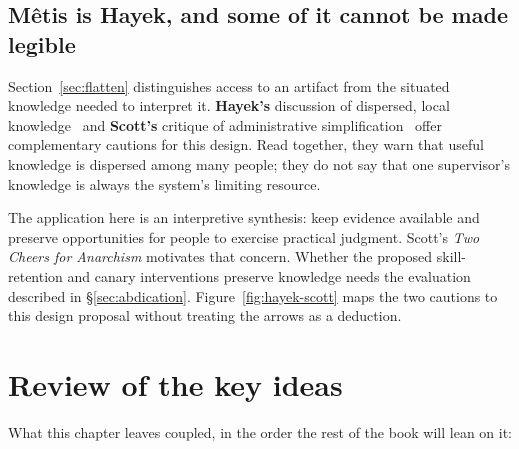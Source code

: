 \documentclass[11pt,a4paper]{article}
\theoremstyle{definition}
\theoremstyle{plain}
\begin{document}
\subsection{M\^etis is Hayek, and some of it cannot be made legible}\label{sec:hayek}

Section~\ref{sec:flatten} distinguishes access to an artifact from the situated
knowledge needed to interpret it. \textbf{Hayek's} discussion of dispersed,
local knowledge~ and \textbf{Scott's} critique of administrative
simplification~ offer complementary cautions for this design.
Read together, they warn that useful knowledge is dispersed among many people;
they do not say that one supervisor's knowledge is always the system's limiting
resource.

The application here is an interpretive synthesis: keep evidence available and
preserve opportunities for people to exercise practical judgment. Scott's
\emph{Two Cheers for Anarchism} motivates that concern.
Whether the proposed skill-retention and canary interventions preserve
knowledge needs the evaluation described in \S\ref{sec:abdication}. Figure~\ref{fig:hayek-scott} maps the two cautions to this
design proposal without treating the arrows as a deduction.



\pdexercisepointer{\ref{ex:ls-hobbes-mapping}}{\ref{ex:ls-express-consent-properties}}{\pageref{ex:ls-hobbes-mapping}}


\section*{Review of the key ideas}

What this chapter leaves coupled, in the order the rest of the book will lean on it:
\end{document}
